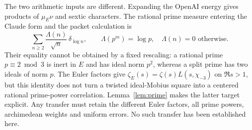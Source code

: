 \documentclass[11pt]{article}
\theoremstyle{remark}\newtheorem{remark}[theorem]{Remark}
\begin{document}
The two arithmetic inputs are different. Expanding the OpenAI energy
gives products of $\mu_E\nu$ and sextic characters. The rational prime
measure entering the Claude form and the packet calculation is
\[
 \sum_{n\ge2}\frac{\Lambda(n)}{\sqrt n}\,\delta_{\log n},
 \qquad
 \Lambda(p^m)=\log p,\quad\Lambda(n)=0\text{ otherwise}.
\]
Their equality cannot be obtained by a fixed rescaling: a rational prime
$p\equiv2\bmod3$ is inert in $E$ and has ideal norm $p^2$, whereas a
split prime has two ideals of norm $p$. The Euler factors give
$\zeta_E(s)=\zeta(s)L(s,\chi_{-3})$ on $\Re s>1$, but this identity
does not turn a twisted ideal-Mobius square into a centered rational
prime-power correlation. Lemma~\ref{lem:prime} makes the latter target explicit.
Any transfer must retain the different Euler factors, all prime powers,
archimedean weights and uniform errors. No such transfer has been
established here.
\end{document}
